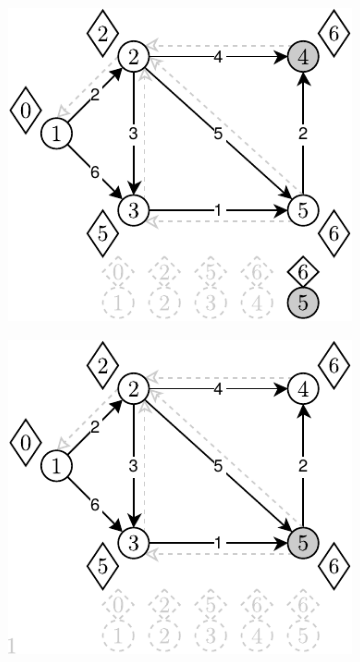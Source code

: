 \begin{figure}[!h]
\begin{subfigure}[b]{0.3\textwidth}
		\caption{}
	\end{subfigure}%
	\begin{subfigure}[b]{0.3\textwidth}
		\includegraphics[width=\textwidth]{Chapter_II/DIJKSTRA-DLList/e.pdf}
		\caption{}
	\end{subfigure}
	\begin{subfigure}[b]{0.3\textwidth}
		\includegraphics[width=\textwidth]{Chapter_II/DIJKSTRA-DLList/f.pdf}

\end{subfigure}
\end{figure}
